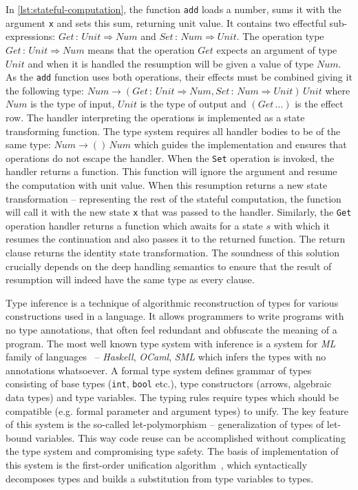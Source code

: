 \documentclass[inz, english, longabstract]{iithesis}
\begin{document}
In \autoref{lst:stateful-computation}, the function \texttt{add} loads a number, sums it with the argument \texttt{x} and sets this sum, returning unit value.
It contains two effectful sub-expressions: $Get \, : \, Unit \Rightarrow Num$ and $Set \, : \, Num \Rightarrow Unit$.
The operation type $Get \, : \, Unit \Rightarrow Num$ means that the operation $Get$ expects an argument of type $Unit$ and when it is handled the resumption will be given a value of type $Num$.
As the \texttt{add} function uses both operations, their effects must be combined giving it the following type: $Num \rightarrow (Get \, : \, Unit \Rightarrow Num , Set \, : \, Num \Rightarrow Unit) \, Unit$ where $Num$ is the type of input, $Unit$ is the type of output and $(Get \, \ldots)$ is the effect row.
The handler interpreting the operations is implemented as a state transforming function.
The type system requires all handler bodies to be of the same type: $Num \rightarrow () \, Num$ which guides the implementation and ensures that operations do not escape the handler.
When the \texttt{Set} operation is invoked, the handler returns a function.
This function will ignore the argument and resume the computation with unit value.
When this resumption returns a new state transformation -- representing the rest of the stateful computation, the function will call it with the new state \texttt{x} that was passed to the handler.
Similarly, the \texttt{Get} operation handler returns a function which awaits for a state $s$ with which it resumes the continuation and also passes it to the returned function.
The return clause returns the identity state transformation.
The soundness of this solution crucially depends on the deep handling semantics to ensure that the result of resumption will indeed have the same type as every clause.

Type inference is a technique of algorithmic reconstruction of types for various constructions used in a language.
It allows programmers to write programs with no type annotations, that often feel redundant and obfuscate the meaning of a program.
The most well known type system with inference is a system for \emph{ML} family of languages~\cite{Pierce2002} -- \emph{Haskell}, \emph{OCaml}, \emph{SML} which infers the types with no annotations whatsoever.
A formal type system defines grammar of types consisting of base types (\texttt{int}, \texttt{bool} etc.), type constructors (arrows, algebraic data types) and type variables.
The typing rules require types which should be compatible (e.g. formal parameter and argument types) to unify.
The key feature of this system is the so-called let-polymorphism -- generalization of types of let-bound variables.
This way code reuse can be accomplished without complicating the type system and compromising type safety.
The basis of implementation of this system is the first-order unification algorithm~\cite{Pierce2002}, which syntactically decomposes types and builds a substitution from type variables to types.
\end{document}
